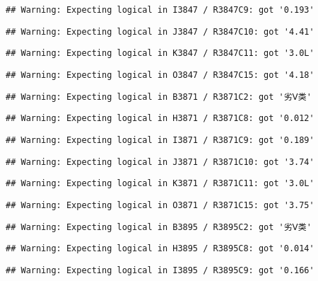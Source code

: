 \documentclass[
]{article}
\begin{document}
\begin{verbatim}
## Warning: Expecting logical in I3847 / R3847C9: got '0.193'
\end{verbatim}

\begin{verbatim}
## Warning: Expecting logical in J3847 / R3847C10: got '4.41'
\end{verbatim}

\begin{verbatim}
## Warning: Expecting logical in K3847 / R3847C11: got '3.0L'
\end{verbatim}

\begin{verbatim}
## Warning: Expecting logical in O3847 / R3847C15: got '4.18'
\end{verbatim}

\begin{verbatim}
## Warning: Expecting logical in B3871 / R3871C2: got '劣Ⅴ类'
\end{verbatim}

\begin{verbatim}
## Warning: Expecting logical in H3871 / R3871C8: got '0.012'
\end{verbatim}

\begin{verbatim}
## Warning: Expecting logical in I3871 / R3871C9: got '0.189'
\end{verbatim}

\begin{verbatim}
## Warning: Expecting logical in J3871 / R3871C10: got '3.74'
\end{verbatim}

\begin{verbatim}
## Warning: Expecting logical in K3871 / R3871C11: got '3.0L'
\end{verbatim}

\begin{verbatim}
## Warning: Expecting logical in O3871 / R3871C15: got '3.75'
\end{verbatim}

\begin{verbatim}
## Warning: Expecting logical in B3895 / R3895C2: got '劣Ⅴ类'
\end{verbatim}

\begin{verbatim}
## Warning: Expecting logical in H3895 / R3895C8: got '0.014'
\end{verbatim}

\begin{verbatim}
## Warning: Expecting logical in I3895 / R3895C9: got '0.166'
\end{verbatim}
\end{document}
